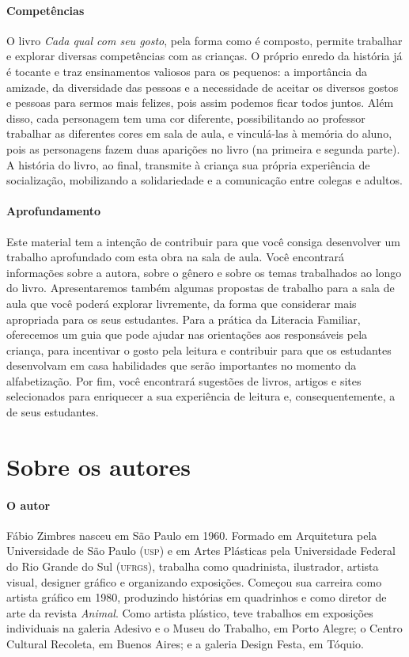 \documentclass[11pt]{extarticle}
\begin{document}
\paragraph{Competências}
O livro \textit{Cada qual com seu gosto}, pela forma como é composto, permite trabalhar e explorar diversas competências com as crianças. O próprio enredo da história já é tocante e traz ensinamentos valiosos para os pequenos: a importância da amizade, da diversidade das pessoas e a necessidade de aceitar os diversos gostos e pessoas para sermos mais felizes, pois assim podemos ficar todos juntos. Além disso, cada personagem tem uma cor diferente, possibilitando ao professor trabalhar as diferentes cores em sala de aula, e vinculá-las à memória do aluno, pois as personagens fazem duas aparições no livro (na primeira e segunda parte). A história do livro, ao final, transmite à criança sua própria experiência de socialização, mobilizando a solidariedade e a comunicação entre colegas e adultos.


\paragraph{Aprofundamento} Este material tem a 
intenção de contribuir para que você consiga desenvolver um trabalho aprofundado 
com esta obra na sala de aula. Você encontrará informações sobre a autora, sobre 
o gênero e sobre os temas trabalhados ao longo do livro. Apresentaremos também 
algumas propostas de trabalho para a sala de aula que você poderá explorar livremente, 
da forma que considerar mais apropriada para os seus estudantes. Para a prática 
da Literacia Familiar, oferecemos um guia que pode ajudar nas orientações aos 
responsáveis pela criança, para incentivar o gosto pela leitura e contribuir para 
que os estudantes desenvolvam em casa habilidades que serão importantes no momento 
da alfabetização. Por fim, você encontrará sugestões de livros, artigos e sites 
selecionados para enriquecer a sua experiência de leitura e, 
consequentemente, a de seus estudantes.



\section{Sobre os autores}

\paragraph{O autor} Fábio Zimbres nasceu em São Paulo em 1960. Formado em Arquitetura pela Universidade de São Paulo (\textsc{usp}) e em Artes Plásticas pela Universidade Federal do Rio Grande do Sul (\textsc{ufrgs}), trabalha como quadrinista, ilustrador, artista visual, designer gráfico e organizando exposições. Começou sua carreira como artista gráfico em 1980, produzindo histórias em quadrinhos e como diretor de arte da revista \textit{Animal}. Como artista plástico, teve trabalhos em exposições individuais na galeria Adesivo e o Museu do Trabalho, em Porto Alegre; o Centro Cultural Recoleta, em Buenos Aires; e a galeria Design Festa, em Tóquio.
\end{document}
